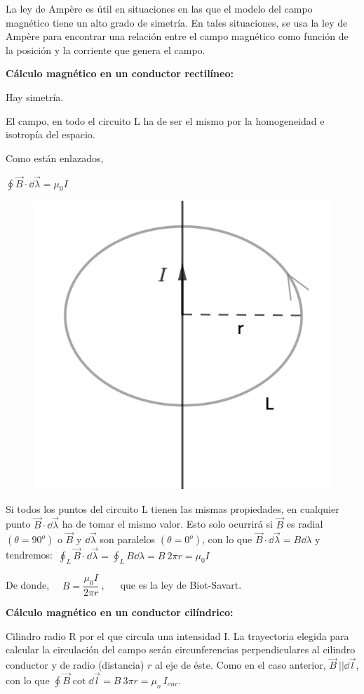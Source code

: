 La ley de Ampère es útil en situaciones en las que el modelo del campo magnético tiene un alto grado de simetría. En tales situaciones, se usa la ley de Ampère para encontrar una relación entre el campo magnético como función de la posición y la corriente que genera el campo.

\textbf{Cálculo magnético en un conductor rectilíneo:}

\begin{multicols}{2}
Hay simetría.

El campo, en todo el circuito L ha de ser el mismo por la homogeneidad e isotropía del espacio.

Como están enlazados,

$ \displaystyle \oint \vec B \cdot \dd \vec \lambda = \mu_0 I$
\begin{figure}[H]
	\centering
	\includegraphics[width=.35\textwidth]{imagenes/imagenes27/T27IM05.png}
\end{figure}	
\end{multicols}

Si todos los puntos del circuito L tienen las mismas propiedades, en cualquier punto $\vec B \cdot \dd \vec \lambda$ ha de tomar el mismo valor. Esto solo ocurrirá si $\vec B$ es radial $(\theta=90^o)$ o $\vec B$ y $\dd \vec \lambda$ son paralelos $(\theta=0^o)$, con lo que 
	 $\vec B \cdot \dd \vec \lambda=B\dd \lambda$ y tendremos:
$\  \displaystyle \oint_L \vec B \cdot \dd \vec \lambda= \oint_L B \dd \lambda = B \ 2\pi r=\mu_0 I$

De donde, $\quad B=\dfrac{\mu_0 I}{2\pi r}\ $, $\quad$ que es la ley de Biot-Savart.

\vspace{10mm} %

\textbf{Cálculo magnético en un conductor cilíndrico:}

Cilindro radio R por el que circula una intensidad I. La trayectoria elegida para calcular la circulación del campo serán circunferencias perpendiculares al cilindro conductor y de radio (distancia) $r$ al eje de éste. Como en el caso anterior, $\vec B \ || \dd \vec l$, con lo que $\oint \vec B \cot \dd \vec l=B\ 3\pi r = \mu_o \ I_{enc}$.

